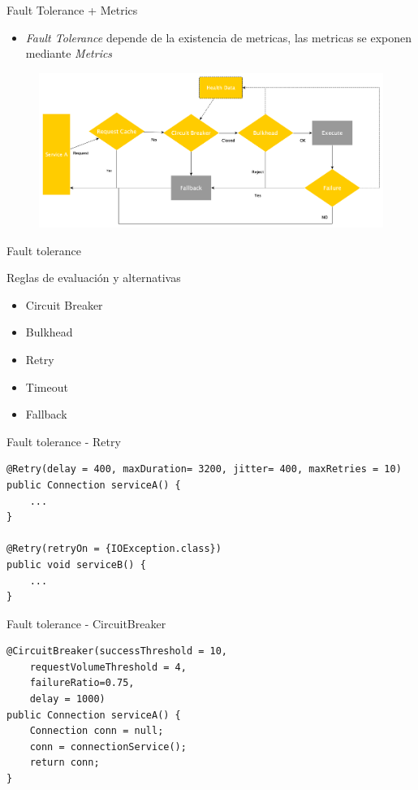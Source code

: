 \documentclass[aspectratio=169]{beamer}
\begin{document}
\begin{frame}{Fault Tolerance + Metrics}

\begin{itemize}
	\item \textit{Fault Tolerance} depende de la existencia de metricas, las metricas se exponen  mediante \textit{Metrics}
\end{itemize}

\begin{figure}
	\centering
	\includegraphics[width=0.9\linewidth]{Images/falldata}
\end{figure}

\end{frame}


\begin{frame}{Fault tolerance}

Reglas de evaluación y alternativas
\begin{itemize}
\item Circuit Breaker
\item Bulkhead
\item Retry
\item Timeout
\item Fallback
\end{itemize}

\end{frame}

\begin{frame}[fragile]{Fault tolerance - Retry}
\begin{lstlisting}
@Retry(delay = 400, maxDuration= 3200, jitter= 400, maxRetries = 10)
public Connection serviceA() {
	...
}

@Retry(retryOn = {IOException.class})
public void serviceB() {
	...
}
\end{lstlisting}
\end{frame}

\begin{frame}[fragile]{Fault tolerance - CircuitBreaker}
\begin{lstlisting}
@CircuitBreaker(successThreshold = 10,
	requestVolumeThreshold = 4,
	failureRatio=0.75,
	delay = 1000)
public Connection serviceA() {
	Connection conn = null;
	conn = connectionService();
	return conn;
}
\end{lstlisting}
\end{frame}
\end{document}

